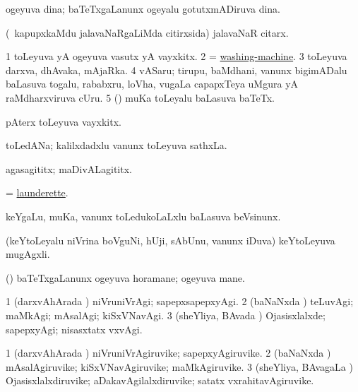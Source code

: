 \bentry
{} 
\gl{\nA}
\expl{}
\bmng
ogeyuva dina; baTeTxgaLanunx ogeyalu gotutxmADiruva dina. 
\emng
\eentry

\bentry
{} 
\gl{\nA}
\expl{}
\bmng
(\kanmu\ kapupxkaMdu jalavaNaRgaLiMda citirxsida) jalavaNaR citarx. 
\emng
\eentry

\bentry
{} 
\gl{\nA}
\expl{}
\bmng
\bnum
\num{1} toLeyuva yA ogeyuva vasutx yA vayxkitx. 
\num{2} = \hyperlink{washing-machine}{washing-machine}. 
\num{3} toLeyuva darxva, dhAvaka, mAjaRka. 
\num{4} vASaru; tirupu, baMdhani, \mo vanunx bigimADalu baLasuva togalu, rababxru, loVha, \mo vugaLa capapxTeya uMgura yA raMdharxviruva cUru. 
\num{5} (\AseTxrXV) muKa toLeyalu baLasuva baTeTx. 
\enum
\emng
\eentry

\bentry
{} 
\gl{\nA}
\bmng
pAterx toLeyuva vayxkitx. 
\emng
\eentry

\bentry
{} 
\gl{\nA}
\expl{}
\bmng
toLedANa; kalilxdadxlu \mo vanunx toLeyuva sathxLa. 
\emng
\eentry

\bentry
{} 
\gl{\nA}
\bmng
agasagititx; maDivALagititx. 
\emng
\eentry

\bentry
{} 
\gl{\nA}
\expl{}
\bmng
= \hyperref{kandict_l.pdf}{L}{launderette}{launderette}. 
\emng
\eentry

\bentry
{} 
\gl{\nA}
\expl{}
\bmng
keYgaLu, muKa, \mo vanunx toLedukoLaLxlu baLasuva beVsinunx. 
\emng
\eentry

\bentry
{} 
\gl{\nA}
\expl{}
\bmng
(keYtoLeyalu niVrina boVguNi, hUji, sAbUnu, \mo vanunx iDuva) keYtoLeyuva mugAgxli. 
\emng
\eentry

\bentry
{} 
\gl{\nA}
\expl{}
\bmng
(\kanmu) baTeTxgaLanunx ogeyuva horamane; ogeyuva mane. 
\emng
\eentry

\bentry
{} 
\gl{\kirxvi}
\expl{}
\bmng
\bnum
\num{1} (darxvAhArada \vi) niVruniVrAgi; sapepxsapepxyAgi. 
\num{2} (baNaNxda \vi) teLuvAgi; maMkAgi; mAsalAgi; kiSxVNavAgi. 
\num{3} (sheYliya, BAvada \vi) Ojasisxlalxde; sapepxyAgi; nisasxtatx vxvAgi. 
\enum
\emng
\eentry

\bentry
{} 
\gl{\nA}
\expl{}
\bmng
\bnum
\num{1} (darxvAhArada \vi) niVruniVrAgiruvike; sapepxyAgiruvike. 
\num{2} (baNaNxda \vi) mAsalAgiruvike; kiSxVNavAgiruvike; maMkAgiruvike. 
\num{3} (sheYliya, BAvagaLa \vi) Ojasisxlalxdiruvike; aDakavAgilalxdiruvike; satatx vxrahitavAgiruvike. 
\enum
\emng
\eentry

